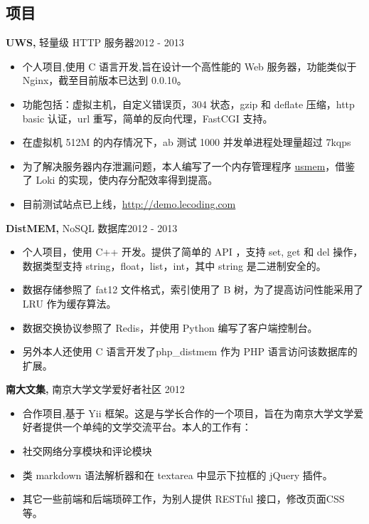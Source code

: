 ﻿\documentclass[margin]{res}
\begin{document}
\begin{resume}
\section{项目}
 {\bf UWS,} 轻量级 HTTP 服务器\hfill 2012 - 2013
 \begin{itemize} \itemsep -2pt

\item 个人项目,使用 C 语言开发,旨在设计一个高性能的 Web 服务器，功能类似于 Nginx，截至目前版本已达到 0.0.10。
\item 功能包括：虚拟主机，自定义错误页，304 状态，gzip 和 deflate 压缩，http basic 认证，url 重写，简单的反向代理，FastCGI 支持。
\item 在虚拟机 512M 的内存情况下，ab 测试 1000 并发单进程处理量超过 7kqps
\item 为了解决服务器内存泄漏问题，本人编写了一个内存管理程序 \href{https://github.com/usbuild/usmem}{usmem}，借鉴了 Loki 的实现，使内存分配效率得到提高。
\item 目前测试站点已上线，\href{http://demo.lecoding.com}{http://demo.lecoding.com}
\end{itemize}

 
 
{\bf DistMEM,} NoSQL 数据库\hfill  2012 - 2013
\begin{itemize} \itemsep -2pt
\item 个人项目，使用 C++ 开发。提供了简单的 API ，支持 set, get 和 del 操作， 数据类型支持 string，float，list，int，其中 string 是二进制安全的。
\item 数据存储参照了 fat12 文件格式，索引使用了 B 树，为了提高访问性能采用了 LRU 作为缓存算法。
\item 数据交换协议参照了 Redis，并使用 Python 编写了客户端控制台。
\item 另外本人还使用 C 语言开发了php\_distmem 作为 PHP 语言访问该数据库的扩展。
\end{itemize}

{\bf 南大文集,} 南京大学文学爱好者社区 \hfill 2012
\begin{itemize} \itemsep -2pt
\item 合作项目,基于 Yii 框架。这是与学长合作的一个项目，旨在为南京大学文学爱好者提供一个单纯的文学交流平台。本人的工作有：
\item 社交网络分享模块和评论模块
\item 类 markdown 语法解析器和在 textarea 中显示下拉框的 jQuery 插件。
\item 其它一些前端和后端琐碎工作，为别人提供 RESTful 接口，修改页面CSS等。
\end{itemize}


\end{resume}
\end{document}
